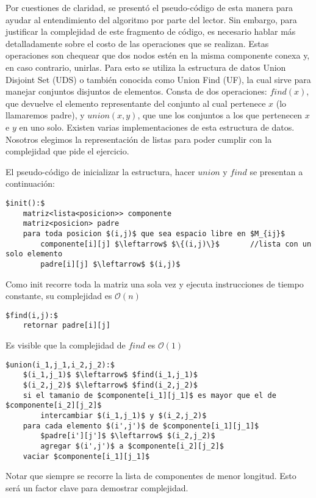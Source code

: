 Por cuestiones de claridad, se presentó el pseudo-código de esta manera para ayudar al entendimiento del algoritmo por parte del lector. Sin embargo, para justificar la complejidad de este fragmento de código, es necesario hablar más detalladamente sobre el costo de las operaciones que se realizan. Estas operaciones son chequear que dos nodos estén en la misma componente conexa y, en caso contrario, unirlas. Para esto se utiliza la estructura de datos Union Disjoint Set (UDS) o también conocida como Union Find (UF), la cual sirve para manejar conjuntos disjuntos de elementos. Consta de dos operaciones: $find(x)$, que devuelve el elemento representante del conjunto al cual pertenece $x$ (lo llamaremos padre), y $union(x,y)$, que une los conjuntos a los que pertenecen $x$ e $y$ en uno solo. Existen varias implementaciones de esta estructura de datos. Nosotros elegimos la representación de listas para poder cumplir con la complejidad que pide el ejercicio.

El pseudo-código de inicializar la estructura, hacer $union$ y $find$ se presentan a continuación:

\begin{lstlisting}
$init():$
	matriz<lista<posicion>> componente
	matriz<posicion> padre
	para toda posicion $(i,j)$ que sea espacio libre en $M_{ij}$
		componente[i][j] $\leftarrow$ $\{(i,j)\}$		//lista con un solo elemento
		padre[i][j] $\leftarrow$ $(i,j)$
\end{lstlisting}

Como init recorre toda la matriz una sola vez y ejecuta instrucciones de tiempo constante, su complejidad es $\mathcal{O}(n)$

\begin{lstlisting}
$find(i,j):$
	retornar padre[i][j]
\end{lstlisting}

Es visible que la complejidad de $find$ es $\mathcal{O}(1)$

\begin{lstlisting}
$union(i_1,j_1,i_2,j_2):$
	$(i_1,j_1)$ $\leftarrow$ $find(i_1,j_1)$
	$(i_2,j_2)$ $\leftarrow$ $find(i_2,j_2)$
	si el tamanio de $componente[i_1][j_1]$ es mayor que el de $componente[i_2][j_2]$
		intercambiar $(i_1,j_1)$ y $(i_2,j_2)$
	para cada elemento $(i',j')$ de $componente[i_1][j_1]$
		$padre[i'][j']$ $\leftarrow$ $(i_2,j_2)$
		agregar $(i',j')$ a $componente[i_2][j_2]$
	vaciar $componente[i_1][j_1]$
\end{lstlisting}

Notar que siempre se recorre la lista de componentes de menor longitud. Esto será un factor clave para demostrar complejidad.

